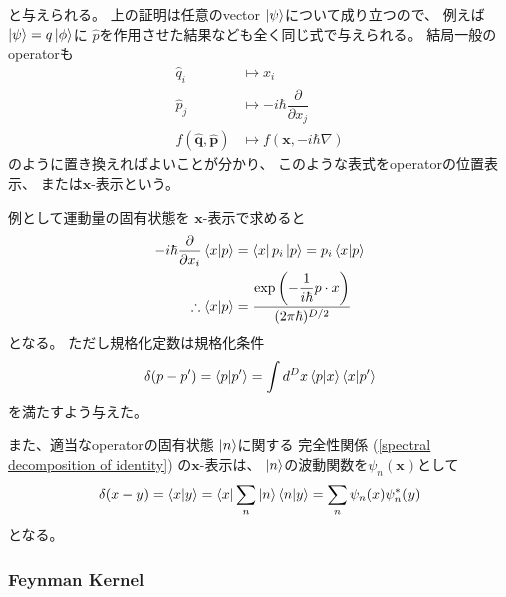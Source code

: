 と与えられる。
上の証明は任意のvector
$\ket{\psi}$について成り立つので、
例えば$\ket{\psi} = q \ket{\phi}$に
$\hat{p}$を作用させた結果なども全く同じ式で与えられる。
結局一般のoperatorも
\begin{subequations}
\begin{align}
    \hat{q}_i
    &\mapsto
    x_i
\\
    \hat{p}_j
    &\mapsto
    - i \hbar
    \dfrac{\partial}{\partial x_j}
\\
    f( \hat{\bm{q}}, \hat{\bm{p}} )
    &\mapsto
    f
    \left( \bm{x}, 
        - i \hbar
        \nabla
    \right)
\end{align}
\end{subequations}
のように置き換えればよいことが分かり、
このような表式をoperatorの位置表示、
または$\bm{x}$-表示という。

例として運動量の固有状態を
$\bm{x}$-表示で求めると
\begin{align}
    - i \hbar
    \dfrac{\partial}{\partial x_i}
    \braket{ x | p }
    &=
    \bra{ x }
    p_i
    \ket{ p }
    =
    p_i
    \braket{ x | p }
\notag\\\therefore
    \braket{ x | p }
    &=
    \dfrac{
        \exp\left(
            -
            \dfrac{1}{i\hbar}
            p \cdot x
        \right)
    }{ (2 \pi \hbar)^{D/2} }
\label{plain wave in qm}
\end{align}
となる。
ただし規格化定数は規格化条件
\begin{align}
    \delta( p - p' )
    =
    \braket{ p | p' }
    =
    \int d^D x
    \braket{ p | x }
    \braket{ x | p' }
\end{align}
を満たすよう与えた。

また、適当なoperatorの固有状態
$\ket{n}$に関する
完全性関係
(\ref{spectral decomposition of identity})
の$\bm{x}$-表示は、
$\ket{n}$の波動関数を$\psi_n( \bm{x} )$として
\begin{align}
    \delta(x - y)
    =
    \braket{ x | y }
    =
    \bra{ x }
        \sum_n
        \ket{n}
        \braket{ n | y }
    =
    \sum_n
    \psi_n( x )
    \psi_n^*( y )
\label{complete set of wave function}
\end{align}
となる。

\subsubsection{Feynman Kernel}

